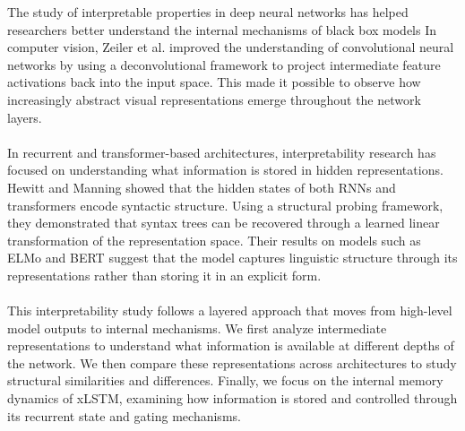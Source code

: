 The study of interpretable properties in deep neural networks has helped researchers better understand 
the internal mechanisms of black box models In computer vision, Zeiler et al. 
\cite{zeiler2013visualizingunderstandingconvolutionalnetworks} improved the understanding of 
convolutional neural networks by using a deconvolutional framework to project intermediate feature 
activations back into the input space. This made it possible to observe how increasingly abstract 
visual representations emerge throughout the network layers. \\ \\ 
%
In recurrent and transformer-based architectures, interpretability research has focused on understanding 
what information is stored in hidden representations. Hewitt and Manning \cite{hewitt-manning-2019-structural} 
showed that the hidden states of both RNNs and transformers encode syntactic structure. 
Using a structural probing framework, they demonstrated that syntax trees can be recovered through a 
learned linear transformation of the representation space. Their results on models such as ELMo 
\cite{peters2018deepcontextualizedwordrepresentations} and BERT \cite{devlin-etal-2019-bert} suggest 
that the model captures linguistic structure through its representations rather than storing it in an explicit form. \\ \\ 
%
This interpretability study follows a layered approach that moves from high-level model outputs to internal 
mechanisms. We first analyze intermediate representations to understand what information is available at 
different depths of the network. We then compare these representations across architectures to study 
structural similarities and differences. Finally, we focus on the internal memory dynamics of xLSTM, 
examining how information is stored and controlled through its recurrent state and gating mechanisms.

